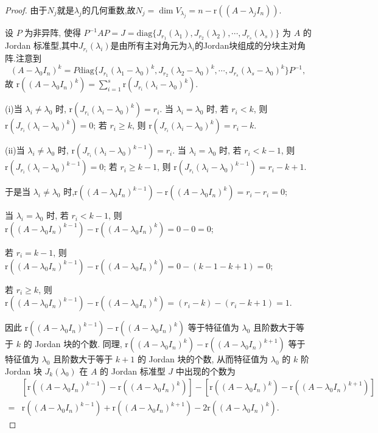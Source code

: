 \documentclass[../../main.tex]{subfiles}%
\begin{document}
\begin{proof}

由于$N_j$就是$\lambda_j$的几何重数,故$N_j=\dim V_{\lambda_j}=n-\mathrm{r}((A - \lambda_j I_n))$.

设 $P$ 为非异阵, 使得 $P^{-1}AP = J = \mathrm{diag}\{J_{r_1}(\lambda_1),J_{r_2}(\lambda_2),\cdots,J_{r_s}(\lambda_s)\}$ 为 $A$ 的 Jordan 标准型,其中$J_{r_i}(\lambda_i)$是由所有主对角元为$\lambda_i$的Jordan块组成的分块主对角阵.注意到
\[
(A - \lambda_0 I_n)^k = P\mathrm{diag}\{J_{r_1}(\lambda_1 - \lambda_0)^k,J_{r_2}(\lambda_2 - \lambda_0)^k,\cdots,J_{r_s}(\lambda_s - \lambda_0)^k\}P^{-1},
\]
故 $\mathrm{r}((A - \lambda_0 I_n)^k) = \sum_{i = 1}^{s}\mathrm{r}(J_{r_i}(\lambda_i - \lambda_0)^k)$.

(i)当 $\lambda_i \neq \lambda_0$ 时, $\mathrm{r}(J_{r_i}(\lambda_i - \lambda_0)^k) = r_i$. 
当 $\lambda_i = \lambda_0$ 时, 
若 $r_i < k$, 则 $\mathrm{r}(J_{r_i}(\lambda_i - \lambda_0)^k) = 0$; 
若 $r_i \geqslant  k$, 则 $\mathrm{r}(J_{r_i}(\lambda_i - \lambda_0)^k) = r_i - k$. 

(ii)当 $\lambda_i \neq \lambda_0$ 时, $\mathrm{r}(J_{r_i}(\lambda_i - \lambda_0)^{k-1}) = r_i$. 
当 $\lambda_i = \lambda_0$ 时, 
若 $r_i < k-1$, 则 $\mathrm{r}(J_{r_i}(\lambda_i - \lambda_0)^{k-1}) = 0$; 
若 $r_i \geqslant  k-1$, 则 $\mathrm{r}(J_{r_i}(\lambda_i - \lambda_0)^{k-1}) = r_i - k+1$. 

于是当 $\lambda_i \neq \lambda_0$ 时,$\mathrm{r}((A - \lambda_0 I_n)^{k - 1}) - \mathrm{r}((A - \lambda_0 I_n)^k)=r_i-r_i=0$;

当 $\lambda_i = \lambda_0$ 时, 
若 $r_i < k-1$, 则$\mathrm{r}((A - \lambda_0 I_n)^{k - 1}) - \mathrm{r}((A - \lambda_0 I_n)^k)=0-0=0$;

若 $r_i =k-1$, 则$\mathrm{r}((A - \lambda_0 I_n)^{k - 1}) - \mathrm{r}((A - \lambda_0 I_n)^k)=0-(k-1-k+1)=0$;

若 $r_i \geqslant  k$, 则$\mathrm{r}((A - \lambda_0 I_n)^{k - 1}) - \mathrm{r}((A - \lambda_0 I_n)^k)=(r_i-k)-(r_i-k+1)=1$.

因此 $\mathrm{r}((A - \lambda_0 I_n)^{k - 1}) - \mathrm{r}((A - \lambda_0 I_n)^k)$ 等于特征值为 $\lambda_0$ 且阶数大于等于 $k$ 的 Jordan 块的个数. 同理, $\mathrm{r}((A - \lambda_0 I_n)^k) - \mathrm{r}((A - \lambda_0 I_n)^{k + 1})$ 等于特征值为 $\lambda_0$ 且阶数大于等于 $k + 1$ 的 Jordan 块的个数, 从而特征值为 $\lambda_0$ 的 $k$ 阶 Jordan 块 $J_k(\lambda_0)$ 在 $A$ 的 Jordan 标准型 $J$ 中出现的个数为
\begin{align*}
&[\mathrm{r}((A - \lambda_0 I_n)^{k - 1}) - \mathrm{r}((A - \lambda_0 I_n)^k)] - [\mathrm{r}((A - \lambda_0 I_n)^k) - \mathrm{r}((A - \lambda_0 I_n)^{k + 1})]\\
=&\mathrm{r}((A - \lambda_0 I_n)^{k - 1}) + \mathrm{r}((A - \lambda_0 I_n)^{k + 1}) - 2\mathrm{r}((A - \lambda_0 I_n)^k). 
\end{align*}

\end{proof}
\end{document}
